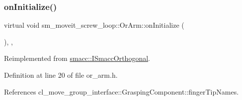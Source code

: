 \subsubsection{\texorpdfstring{on\+Initialize()}{onInitialize()}}
{\footnotesize\ttfamily virtual void sm\+\_\+moveit\+\_\+screw\+\_\+loop\+::\+Or\+Arm\+::on\+Initialize (\begin{DoxyParamCaption}{ }\end{DoxyParamCaption})\hspace{0.3cm}{\ttfamily [inline]}, {\ttfamily [override]}, {\ttfamily [virtual]}}



Reimplemented from \hyperlink{classsmacc_1_1ISmaccOrthogonal_a6bb31c620cb64dd7b8417f8705c79c7a}{smacc\+::\+I\+Smacc\+Orthogonal}.



Definition at line 20 of file or\+\_\+arm.\+h.



References cl\+\_\+move\+\_\+group\+\_\+interface\+::\+Grasping\+Component\+::finger\+Tip\+Names.


